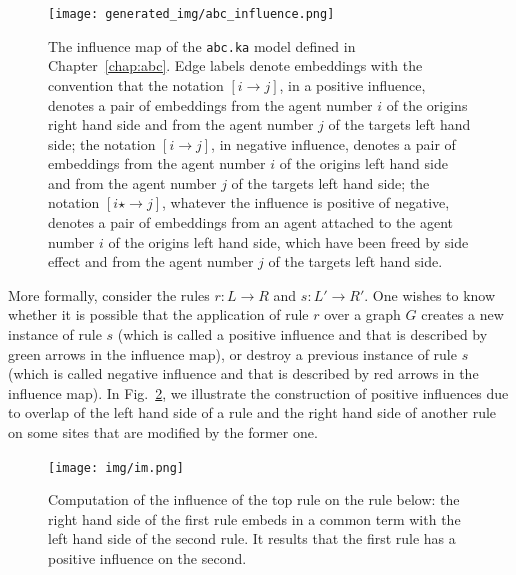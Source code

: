 \documentclass[11pt]{book}
\def\ttt#1{\texttt{#1}}
\def\rar{\rightarrow}
\begin{document}
\begin{figure}[htbp] %
   \centering
   \texttt{[image: generated\_img/abc\_influence.png]}
   \caption{The influence map of the \ttt{abc.ka} model defined in Chapter~\ref{chap:abc}. Edge labels denote embeddings with the convention that
the notation $[i\rar j]$, in a positive influence, denotes a pair of embeddings from the agent number $i$ of the origin{\textquotesingle}s right hand side and from the agent number $j$ of the target{\textquotesingle}s left hand side;
the notation $[i\rar j]$, in negative influence,  denotes a pair of embeddings from the agent number $i$ of the origin{\textquotesingle}s left hand side and from the agent number $j$ of the target{\textquotesingle}s left hand side;
the notation $[i\star \rar j]$, whatever the influence is positive of negative,  denotes a pair of embeddings from an agent attached to the agent number $i$  of the origin{\textquotesingle}s left hand side, which have been freed by side effect  and   from the agent number $j$ of the target{\textquotesingle}s left hand side. }
   \label{fig:kasa-abc-im}
\end{figure}

More formally, consider the rules $r:L\rar R$ and $s:L'\rar R'$. One wishes to know whether it is possible that the application of rule $r$ over a graph $G$ creates a new instance of rule $s$ (which is called a positive influence and that is described by green arrows in the influence map), or destroy a previous instance of rule $s$ (which is called negative influence and that is described by red arrows in the influence map).
In Fig.~\ref{fig:imbis}, we illustrate the construction of positive influences due to overlap of the left hand side of a rule and the right hand side of another rule on some sites that are modified by the former one.

\begin{figure}[htbp] %
   \centering
\texttt{[image: img/im.png]}
   \caption{Computation of the influence of the top rule on the rule below: the right hand side of the first rule embeds in a common term with the left hand side of the second rule. It results that the first rule has a positive influence on the second.}
   \label{fig:imbis}
\end{figure}
\end{document}
